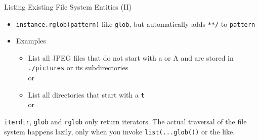 \begin{frame}[fragile]{Listing Existing File System Entities (II)}
%
\begin{itemize}
\item \texttt{instance.rglob(pattern)} like \texttt{glob}, but automatically adds \texttt{**/} to \texttt{pattern}
\item Examples
	\begin{itemize}
	\item List all JPEG files that do not start with a or A and are stored in \texttt{./pictures} or its subdirectories\\
		 or \\
	\item List all directories that start with a \texttt{t} \\
		 or \\
	\end{itemize}
\end{itemize}
%
\begin{hintbox}
\scriptsize
\texttt{iterdir}, \texttt{glob} and \texttt{rglob} only return iterators. The actual traversal of the file system happens lazily, \ie only when you invoke \texttt{list(...glob())} or the like.
\end{hintbox}
%
\end{frame}


